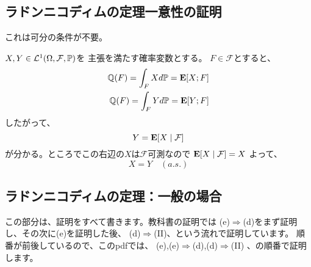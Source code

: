  \subsection{ラドンニコディムの定理一意性の証明}
    これは可分の条件が不要。

    $X,Y \in \mathcal{L}^1(\Omega, \mathcal{F}, {\mathbb{P}})$を
    主張を満たす確率変数とする。
    $F \in \mathcal{F}$とすると、
    \begin{align*}
      \mathbb{Q}(F) = \int_F X d{\mathbb{P}} = {\mathbf{E}}[X;F]\\
      \mathbb{Q}(F) = \int_F Y d{\mathbb{P}} = {\mathbf{E}}[Y;F]
    \end{align*}
    したがって、
    \[
      Y = {\mathbf{E}}[X \mid \mathcal{F}]
    \]
    が分かる。ところでこの右辺の$X$は$\mathcal{F}$可測なので
    ${\mathbf{E}}[X \mid \mathcal{F}] = X$
    よって、
    \[
      X = Y \quad (a.s.)
    \]

  \subsection{ラドンニコディムの定理：一般の場合}
    この部分は、証明をすべて書きます。教科書の証明では
    (e)$\Rightarrow$(d)をまず証明し、その次に(e)を証明した後、
    (d)$\Rightarrow$(II)、という流れで証明しています。
    順番が前後しているので、このpdfでは、
    (e),(e)$\Rightarrow$(d),(d)$\Rightarrow$(II)
    、の順番で証明します。
